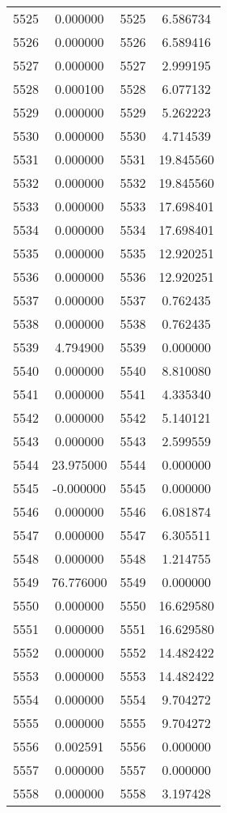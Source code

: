 \documentclass[12pt]{article}
\begin{document}
\begin{longtable}{@{}cccc@{}}
5525 & 0.000000 & 5525 & 6.586734 \\
5526 & 0.000000 & 5526 & 6.589416 \\
5527 & 0.000000 & 5527 & 2.999195 \\
5528 & 0.000100 & 5528 & 6.077132 \\
5529 & 0.000000 & 5529 & 5.262223 \\
5530 & 0.000000 & 5530 & 4.714539 \\
5531 & 0.000000 & 5531 & 19.845560 \\
5532 & 0.000000 & 5532 & 19.845560 \\
5533 & 0.000000 & 5533 & 17.698401 \\
5534 & 0.000000 & 5534 & 17.698401 \\
5535 & 0.000000 & 5535 & 12.920251 \\
5536 & 0.000000 & 5536 & 12.920251 \\
5537 & 0.000000 & 5537 & 0.762435 \\
5538 & 0.000000 & 5538 & 0.762435 \\
5539 & 4.794900 & 5539 & 0.000000 \\
5540 & 0.000000 & 5540 & 8.810080 \\
5541 & 0.000000 & 5541 & 4.335340 \\
5542 & 0.000000 & 5542 & 5.140121 \\
5543 & 0.000000 & 5543 & 2.599559 \\
5544 & 23.975000 & 5544 & 0.000000 \\
5545 & -0.000000 & 5545 & 0.000000 \\
5546 & 0.000000 & 5546 & 6.081874 \\
5547 & 0.000000 & 5547 & 6.305511 \\
5548 & 0.000000 & 5548 & 1.214755 \\
5549 & 76.776000 & 5549 & 0.000000 \\
5550 & 0.000000 & 5550 & 16.629580 \\
5551 & 0.000000 & 5551 & 16.629580 \\
5552 & 0.000000 & 5552 & 14.482422 \\
5553 & 0.000000 & 5553 & 14.482422 \\
5554 & 0.000000 & 5554 & 9.704272 \\
5555 & 0.000000 & 5555 & 9.704272 \\
5556 & 0.002591 & 5556 & 0.000000 \\
5557 & 0.000000 & 5557 & 0.000000 \\
5558 & 0.000000 & 5558 & 3.197428 \\

\end{longtable}
\end{document}
